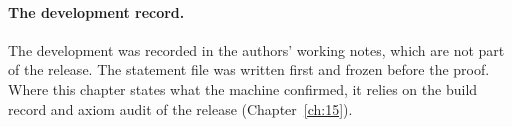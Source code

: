 \paragraph{The development record.}  The development was recorded in the authors' working notes, which are not part of
the release.  The statement file was written first and frozen before the proof.  Where this chapter states what the
machine confirmed, it relies on the build record and axiom audit of the release (Chapter~\ref{ch:15}).

\endgroup
